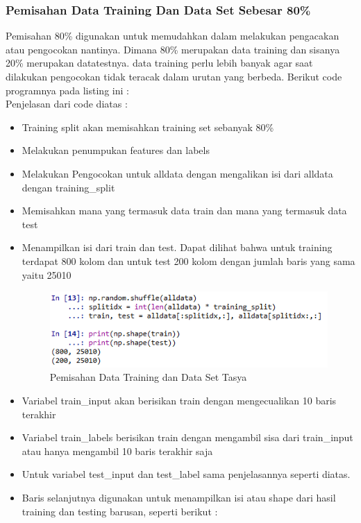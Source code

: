 \begin{enumerate}
\begin{itemize}
\subsubsection{Pemisahan Data Training Dan Data Set Sebesar 80\%}
\par Pemisahan 80\% digunakan untuk memudahkan dalam melakukan pengacakan atau pengocokan nantinya. Dimana 80\% merupakan data training dan sisanya 20\% merupakan datatestnya. data training perlu lebih banyak agar saat dilakukan pengocokan tidak teracak dalam urutan yang berbeda. Berikut code programnya pada listing ini :\\

Penjelasan dari code diatas :
\begin{itemize}
\item Training split akan memisahkan training set sebanyak 80\%
\item Melakukan penumpukan features dan labels
\item Melakukan Pengocokan untuk alldata dengan mengalikan isi dari alldata dengan training\_split
\item Memisahkan mana yang termasuk data train dan mana yang termasuk data test
\item Menampilkan isi dari train dan test. Dapat dilihat bahwa untuk training terdapat 800 kolom dan untuk test 200 kolom dengan jumlah baris yang sama yaitu 25010
\begin{figure}[ht]
\centering
\includegraphics[scale=0.5]{figures/chapter6tasya15.png}
\caption{Pemisahan Data Training dan Data Set Tasya}
\label{Praktek}
\end{figure}
\item Variabel train\_input akan berisikan train dengan mengecualikan 10 baris terakhir
\item Variabel train\_labels berisikan train dengan mengambil sisa dari train\_input atau hanya mengambil 10 baris terakhir saja
\item Untuk variabel test\_input dan test\_label sama penjelasannya seperti diatas.
\item Baris selanjutnya digunakan untuk menampilkan isi atau shape dari hasil training dan testing barusan, seperti berikut :

\end{itemize}
\end{itemize}
\end{enumerate}
